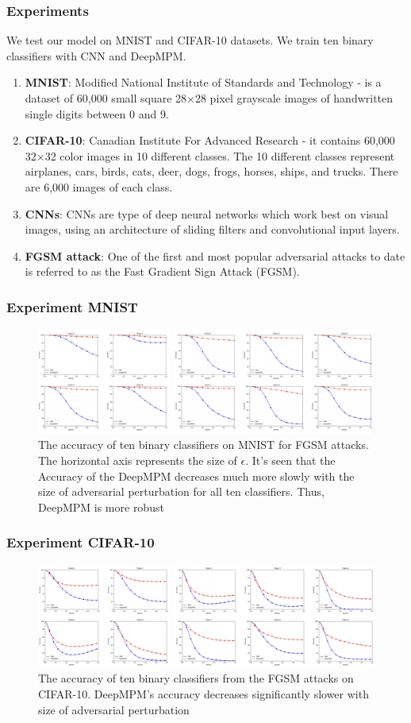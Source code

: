 \documentclass{beamer}
\begin{document}
\begin{frame}[fragile]
\frametitle{Experiments}
We test our model on MNIST and CIFAR-10 datasets. We train ten binary classifiers with CNN and DeepMPM.
\begin{enumerate}
    \item \textbf{MNIST}: Modified National Institute of Standards and Technology - is a dataset of 60,000 small square 28×28 pixel grayscale images of handwritten single digits between 0 and 9.
    \item \textbf{CIFAR-10}: Canadian Institute For Advanced Research - it contains 60,000 32$\times$32 color images in 10 different classes. The 10 different classes represent airplanes, cars, birds, cats, deer, dogs, frogs, horses, ships, and trucks. There are 6,000 images of each class.
    \item \textbf{CNNs}: CNNs are type of deep neural networks which work best on visual images, using an architecture of sliding filters and convolutional input layers.
    \item \textbf{FGSM attack}: One of the first and most popular adversarial attacks to date is referred to as the Fast Gradient Sign Attack (FGSM).
\end{enumerate}

\end{frame}
\begin{frame}[fragile]
\frametitle{Experiment MNIST}
\begin{figure}
    \includegraphics[scale=0.3]{simulations_rp.png}
    \caption{The accuracy of ten binary classifiers on MNIST for FGSM attacks. The horizontal axis represents the size of $\epsilon$. It’s seen that the Accuracy of the DeepMPM decreases much more slowly with the size of adversarial perturbation for all ten classifiers. Thus, DeepMPM is more robust}
\end{figure}
\end{frame}

\begin{frame}[fragile]
\frametitle{Experiment CIFAR-10}
\begin{figure}
    \includegraphics[scale=0.3]{simulation_1_rp.png}
    \caption{The accuracy of ten binary classifiers from the FGSM attacks on CIFAR-10. DeepMPM’s accuracy decreases significantly slower with size of
adversarial perturbation}
\end{figure}
\end{frame}
\end{document}
